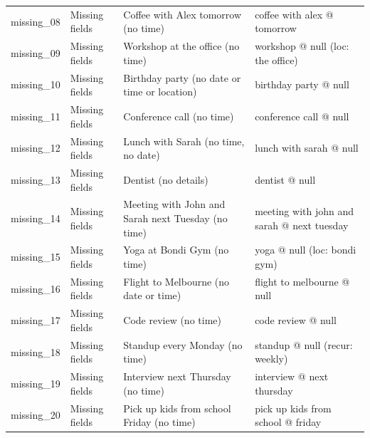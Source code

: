 \begin{longtable}{@{}p{2.2cm}p{2.1cm}p{5cm}p{5cm}@{}}
missing\_08 & Missing fields & Coffee with Alex tomorrow (no time) & coffee with alex @ tomorrow \\
missing\_09 & Missing fields & Workshop at the office (no time) & workshop @ null (loc: the office) \\
missing\_10 & Missing fields & Birthday party (no date or time or location) & birthday party @ null \\
missing\_11 & Missing fields & Conference call (no time) & conference call @ null \\
missing\_12 & Missing fields & Lunch with Sarah (no time, no date) & lunch with sarah @ null \\
missing\_13 & Missing fields & Dentist (no details) & dentist @ null \\
missing\_14 & Missing fields & Meeting with John and Sarah next Tuesday (no time) & meeting with john and sarah @ next tuesday \\
missing\_15 & Missing fields & Yoga at Bondi Gym (no time) & yoga @ null (loc: bondi gym) \\
missing\_16 & Missing fields & Flight to Melbourne (no date or time) & flight to melbourne @ null \\
missing\_17 & Missing fields & Code review (no time) & code review @ null \\
missing\_18 & Missing fields & Standup every Monday (no time) & standup @ null (recur: weekly) \\
missing\_19 & Missing fields & Interview next Thursday (no time) & interview @ next thursday \\
missing\_20 & Missing fields & Pick up kids from school Friday (no time) & pick up kids from school @ friday \\
\end{longtable}
